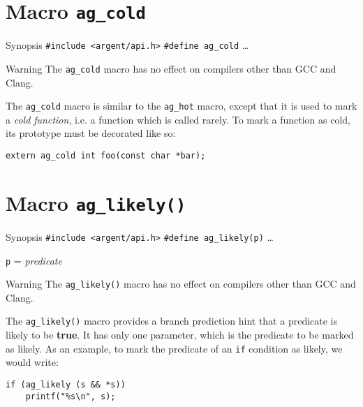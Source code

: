 \section{Macro \texttt{ag\_cold}}

\begin{bclogo}[logo=\bccrayon, noborder=true, barre=snake, couleurBarre=gray]
    {Synopsis}
  \verb|#include <argent/api.h>|
  \verb|#define ag_cold| \ldots
\end{bclogo}

\begin{bclogo}[logo=\bctakecare, noborder=true, couleurBarre=orange]{Warning}
  The \verb|ag_cold| macro has no effect on compilers other than GCC and Clang.
\end{bclogo}

The \verb|ag_cold| macro is similar to the \verb|ag_hot| macro, except
that it is used to mark a \emph{cold function}, i.e. a function which is called
rarely. To mark a function as cold, its prototype must be decorated like so:
\begin{lstlisting}[linewidth=1.0\linewidth]
extern ag_cold int foo(const char *bar);
\end{lstlisting}



\section{Macro \texttt{ag\_likely()}}

\begin{bclogo}[logo=\bccrayon, noborder=true, barre=snake, couleurBarre=gray]
    {Synopsis}
  \verb|#include <argent/api.h>|
  \verb|#define ag_likely(p)| \ldots
  \par
  \texttt{p} = \emph{predicate}
\end{bclogo}

\begin{bclogo}[logo=\bctakecare, noborder=true, couleurBarre=orange]{Warning}
  The \verb|ag_likely()| macro has no effect on compilers other than GCC and 
  Clang.
\end{bclogo}

The \verb|ag_likely()| macro provides a branch prediction hint that a predicate
is likely to be \textbf{true}. It has only one parameter, which is the predicate 
to be marked as likely. As an example, to mark the predicate of an \verb|if| 
condition as likely, we would write:
\begin{lstlisting}[linewidth=1.0\linewidth]
if (ag_likely (s && *s)) 
    printf("%s\n", s);
\end{lstlisting}



